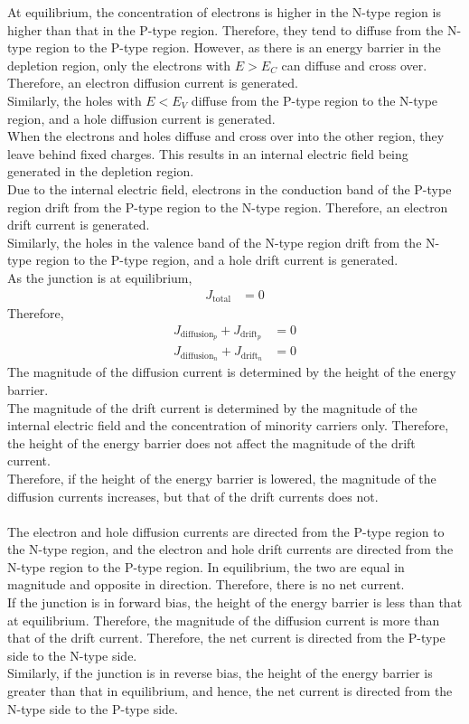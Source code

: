 \documentclass[titlepage, fleqn, a4paper, 12pt, twoside]{article}
\theoremstyle{definition}
\theoremstyle{theorem}
\begin{document}
At equilibrium, the concentration of electrons is higher in the N-type region is higher than that in the P-type region.
Therefore, they tend to diffuse from the N-type region to the P-type region.
However, as there is an energy barrier in the depletion region, only the electrons with $E > E_C$ can diffuse and cross over.
Therefore, an electron diffusion current is generated.\\
Similarly, the holes with $E < E_V$ diffuse from the P-type region to the N-type region, and a hole diffusion current is generated.\\
When the electrons and holes diffuse and cross over into the other region, they leave behind fixed charges.
This results in an internal electric field being generated in the depletion region.\\
Due to the internal electric field, electrons in the conduction band of the P-type region drift from the P-type region to the N-type region.
Therefore, an electron drift current is generated.\\
Similarly, the holes in the valence band of the N-type region drift from the N-type region to the P-type region, and a hole drift current is generated.\\
As the junction is at equilibrium,
\begin{align*}
	J_{\text{total}} &= 0
\end{align*}
Therefore,
\begin{align*}
	J_{\text{diffusion}_p} + J_{\text{drift}_p} &= 0\\
	J_{\text{diffusion}_n} + J_{\text{drift}_n} &= 0
\end{align*}
The magnitude of the diffusion current is determined by the height of the energy barrier.\\
The magnitude of the drift current is determined by the magnitude of the internal electric field and the concentration of minority carriers only.
Therefore, the height of the energy barrier does not affect the magnitude of the drift current.\\
Therefore, if the height of the energy barrier is lowered, the magnitude of the diffusion currents increases, but that of the drift currents does not.\\
~\\
The electron and hole diffusion currents are directed from the P-type region to the N-type region, and the electron and hole drift currents are directed from the N-type region to the P-type region.
In equilibrium, the two are equal in magnitude and opposite in direction.
Therefore, there is no net current.\\
If the junction is in forward bias, the height of the energy barrier is less than that at equilibrium.
Therefore, the magnitude of the diffusion current is more than that of the drift current.
Therefore, the net current is directed from the P-type side to the N-type side.\\
Similarly, if the junction is in reverse bias, the height of the energy barrier is greater than that in equilibrium, and hence, the net current is directed from the N-type side to the P-type side.
\end{document}
